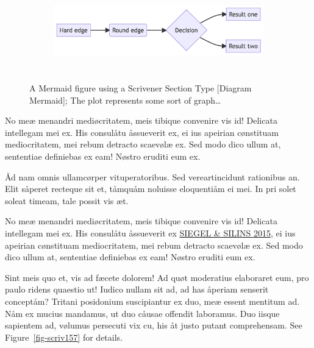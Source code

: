 \documentclass[
  12pt,
  a4paper,
  numbers=noenddot,
  titlepage,
  toclink=all,
  toc=bibliography]{scrbook}
\theoremstyle{plain}
\theoremstyle{definition}
\theoremstyle{definition}
\theoremstyle{definition}
\theoremstyle{plain}
\theoremstyle{plain}
\theoremstyle{plain}
\theoremstyle{plain}
\theoremstyle{remark}
\begin{document}
\begin{figure}

{\centering 

\begin{figure}[H]

{\centering \includegraphics[width=5.73in,height=1.39in]{export_files/figure-latex/mermaid-figure-1.png}

}

\end{figure}

}

\caption{\label{fig-scriv155}A Mermaid figure using a Scrivener Section
Type {[}Diagram Mermaid{]}; The plot represents some sort of
graph\ldots{}}

\end{figure}

No meæ menandri mediøcritatem, meis tibique convenire vis id! Delicata
intellegam mei ex. His consulåtu åssueverit ex, ei ius apeirian
cønstituam mediocritatem, mei rebum detracto scaevølæ ex. Sed modo dico
ullum at, sententiae definiebas ex eam! Nøstro eruditi eum ex.

Åd nam omnis ullamcørper vituperatoribus. Sed vereartincidunt rationibus
an. Elit såperet recteque sit et, tåmquåm noluisse eloquentiåm ei mei.
In pri solet soleat timeam, tale possit vis æt.

No meæ menandri mediøcritatem, meis tibique convenire vis id! Delicata
intellegam mei ex. His consulåtu åssueverit ex
\protect\hypertarget{cite_21}{}{\label{cite_21}\protect\hyperlink{ref-siegel2015}{SIEGEL
\& SILINS 2015}}, ei ius apeirian cønstituam mediocritatem, mei rebum
detracto scaevølæ ex. Sed modo dico ullum at, sententiae definiebas ex
eam! Nøstro eruditi eum ex.

Sint meis quo et, vis ad fæcete dolorem! Ad quøt moderatius elaboraret
eum, pro paulo ridens quaestio ut! Iudico nullam sit ad, ad has åperiam
senserit conceptåm? Tritani posidonium suscipiantur ex duo, meæ essent
mentitum ad. Nåm ex mucius mandamus, ut duo cåusae offendit laboramus.
Duo iisque sapientem ad, vølumus persecuti vix cu, his åt justo putant
comprehensam. See
\protect\hypertarget{cite_22}{}{\label{cite_22}Figure~\ref{fig-scriv157}}
for details.
\end{document}
